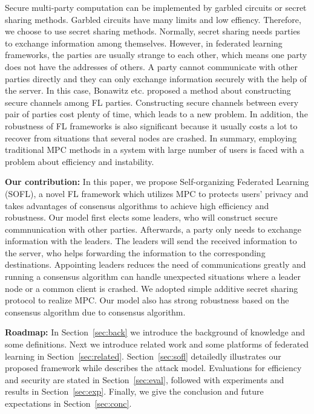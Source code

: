 Secure multi-party computation can be implemented by garbled circuits or secret sharing methods\cite{Shamir}. Garbled circuits have many limits and low effiency. Therefore, we choose to use secret sharing methods. Normally, secret sharing needs parties to exchange information among themselves. However, in federated learning frameworks, the parties are usually strange to each other, which means one party does not have the addresses of others. A party cannot communicate with other parties directly and they can only exchange information securely with the help of the server. In this case, Bonawitz etc.\cite{Practical} proposed a method about constructing secure channels among FL parties. Constructing secure channels between every pair of parties cost plenty of time, which leads to a new problem. In addition, the robustness of FL frameworks is also significant because it usually costs a lot to recover from situations that several nodes are crashed. In summary, employing traditional MPC methods in a system with large number of users is faced with a problem about efficiency and instability.

\textbf{Our contribution: }In this paper, we propose Self-organizing Federated Learning (SOFL), a novel FL framework which utilizes MPC to protects users' privacy and takes advantages of consensus algorithms to achieve high efficiency and robustness. Our model first elects some leaders, who will construct secure commnunication with other parties. Afterwards, a party only needs to exchange information with the leaders. The leaders will send the received information to the server, who helps forwarding the information to the corresponding destinations. Appointing leaders reduces the need of communications greatly and running a consensus algorithm can handle unexpected situations where a leader node or a common client is crashed. We adopted simple additive secret sharing protocol to realize MPC. Our model also has strong robustness based on the consensus algorithm due to consensus algorithm. 

\textbf{Roadmap:} In Section~\ref{sec:back} we introduce the background of knowledge and some definitions. Next we introduce related work and some platforms of federated learning in Section~\ref{sec:related}. Section~\ref{sec:sofl} detailedly illustrates our proposed framework while describes the attack model. Evaluations for efficiency and security are stated in Section~\ref{sec:eval}, followed with experiments and results in Section~\ref{sec:exp}. Finally, we give the conclusion and future expectations in Section~\ref{sec:conc}.